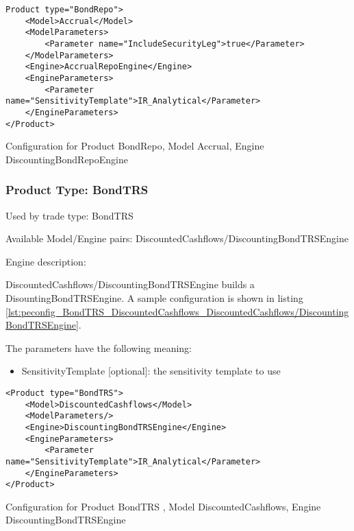 \begin{longlisting}
\begin{verbatim}
Product type="BondRepo">
    <Model>Accrual</Model>
    <ModelParameters>
        <Parameter name="IncludeSecurityLeg">true</Parameter>
    </ModelParameters>
    <Engine>AccrualRepoEngine</Engine>
    <EngineParameters>
        <Parameter name="SensitivityTemplate">IR_Analytical</Parameter>
    </EngineParameters>
</Product>
\end{verbatim}
\caption{Configuration for Product BondRepo, Model Accrual, Engine DiscountingBondRepoEngine}
\label{lst:peconfig_BondRepo_Accrual_AccrualBondRepoEngine}
\end{longlisting}

\subsubsection{Product Type: BondTRS}

Used by trade type: BondTRS

Available Model/Engine pairs: DiscountedCashflows/DiscountingBondTRSEngine

Engine description:

DiscountedCashflows/DiscountingBondTRSEngine builds a DisountingBondTRSEngine. A sample configuration is shown in listing \ref{lst:peconfig_BondTRS_DiscountedCashflows_DiscountedCashflows/DiscountingBondTRSEngine}.

The parameters have the following meaning:

\begin{itemize}
\item SensitivityTemplate [optional]: the sensitivity template to use 
\end{itemize}

\begin{longlisting}
\begin{verbatim}
<Product type="BondTRS">
    <Model>DiscountedCashflows</Model>
    <ModelParameters/>
    <Engine>DiscountingBondTRSEngine</Engine>
    <EngineParameters>
        <Parameter name="SensitivityTemplate">IR_Analytical</Parameter>
    </EngineParameters>
</Product>
\end{verbatim}
\caption{Configuration for Product BondTRS , Model DiscountedCashflows, Engine DiscountingBondTRSEngine}
\label{lst:peconfig_BondTRS_DiscountedCashflows_DiscountedCashflows/DiscountingBondTRSEngine}
\end{longlisting}

